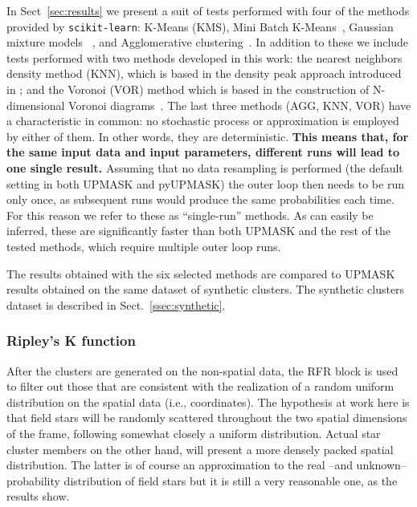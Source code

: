 \documentclass{aa}
\begin{document}
 In Sect~\ref{sec:results} we present a suit of tests performed with
 four of the methods provided by \texttt{scikit-learn}: K-Means (KMS), Mini
 Batch K-Means~\citep[MBK,][]{Sculley2010}, Gaussian mixture models~
 \citep[GMM,][]{Baxter2010}, and Agglomerative
 clustering~\citep[AGG,][]{Zepeda2013}.
 In addition to these we include tests performed with two methods developed in
 this work: the nearest neighbors density method (KNN), which is based in the
 density peak approach introduced in \cite{Rodriguez2014}; and the 
 Voronoi (VOR) method which is based in the construction of N-dimensional
 Voronoi diagrams~\citep{Voronoi_1908}.
 The last three methods (AGG, KNN, VOR) have a characteristic in common:
 no stochastic process or approximation is employed by either of them. In
 other words, they are deterministic.
 \textbf{This means that, for the same input data and input parameters,
 different runs will lead to one single result.}
 Assuming that no data resampling is performed (the default setting in both
 UPMASK and pyUPMASK) the outer loop then needs to be run only once, as
 subsequent runs would produce the same probabilities each time. For this
 reason we refer to these as ``single-run'' methods. As can easily be
 inferred, these are significantly faster than both UPMASK and the rest of the
 tested methods, which require multiple outer loop runs.

 The results obtained with the six selected methods are compared to UPMASK
 results obtained on the same dataset of synthetic clusters. The synthetic
 clusters dataset is described in  Sect.~\ref{ssec:synthetic}.



\subsubsection{Ripley's K function}
 \label{sssec:ripley}

 After the clusters are generated on the non-spatial data, the RFR block is
 used to filter out those that are consistent with the realization of a random
 uniform distribution on the spatial data (i.e., coordinates). The hypothesis
 at work here is that field stars will be randomly scattered throughout the
 two spatial dimensions of the frame, following somewhat closely a uniform
 distribution. Actual star cluster members on the other hand, will present a
 more densely packed spatial distribution.
 The latter is of course an approximation to the real --and unknown--
 probability distribution of field stars but it is still a very reasonable
 one, as the results show.
\end{document}
